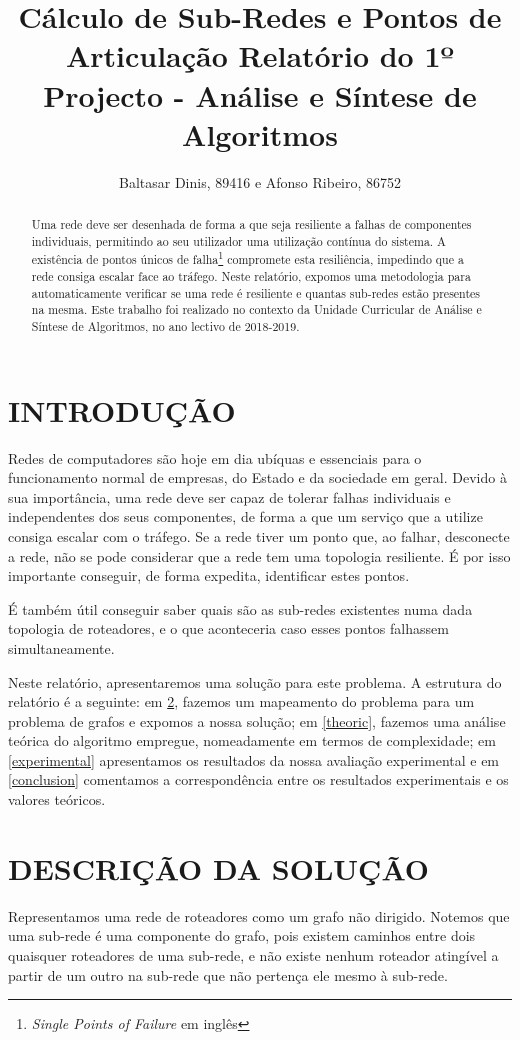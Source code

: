 \documentclass[a4paper, 12pt, conference]{ieeeconf}
\title{{\LARGE \bf Cálculo de Sub-Redes e Pontos de Articulação}
\large{Relatório do 1º Projecto - Análise e Síntese de Algoritmos} }
\author{Baltasar Dinis, 89416 e Afonso Ribeiro, 86752}
\begin{document}
\maketitle
\thispagestyle{empty}
\pagestyle{empty}

\begin{abstract}
  Uma rede deve ser desenhada de forma a que seja resiliente a falhas de
  componentes individuais, permitindo ao seu utilizador uma utilização contínua
  do sistema. A existência de pontos únicos de falha\footnote{\textit{Single
  Points of Failure} em inglês} compromete esta resiliência, impedindo que a
  rede consiga escalar face ao tráfego. Neste relatório, expomos uma
  metodologia para automaticamente verificar se uma rede é resiliente e quantas
  sub-redes estão presentes na mesma. Este trabalho foi realizado no contexto da
  Unidade Curricular de Análise e Síntese de Algoritmos, no ano lectivo de
  2018-2019.
\end{abstract}



\section{INTRODUÇÃO}\label{intro}
Redes de computadores são hoje em dia ubíquas e essenciais para o funcionamento
normal de empresas, do Estado e da sociedade em geral. Devido à sua importância,
uma rede deve ser capaz de tolerar falhas individuais e independentes dos seus
componentes, de forma a que um serviço que a utilize consiga escalar com o
tráfego. Se a rede tiver um ponto que, ao falhar, desconecte a rede, não se pode considerar que a rede tem uma topologia
resiliente. É por isso importante conseguir, de forma expedita, identificar
estes pontos.

É também útil conseguir saber quais são as sub-redes existentes numa dada
topologia de roteadores, e o que aconteceria caso esses pontos falhassem
simultaneamente.

Neste relatório, apresentaremos uma solução para este problema. A estrutura
do relatório é a seguinte: em \ref{sol},
fazemos um mapeamento do problema para um problema de grafos e
expomos a nossa solução; em \ref{theoric}, fazemos uma análise teórica do
algoritmo empregue, nomeadamente em termos de complexidade; em
\ref{experimental} apresentamos os resultados da nossa avaliação experimental e
em \ref{conclusion} comentamos a correspondência entre os resultados
experimentais e os valores teóricos.

\section{DESCRIÇÃO DA SOLUÇÃO}\label{sol}
Representamos uma rede de roteadores como um grafo não dirigido. Notemos que uma
sub-rede é uma componente do grafo, pois existem caminhos entre dois quaisquer
roteadores de uma sub-rede, e não existe nenhum roteador atingível a partir de
um outro na sub-rede que não pertença ele mesmo à sub-rede.
\end{document}
